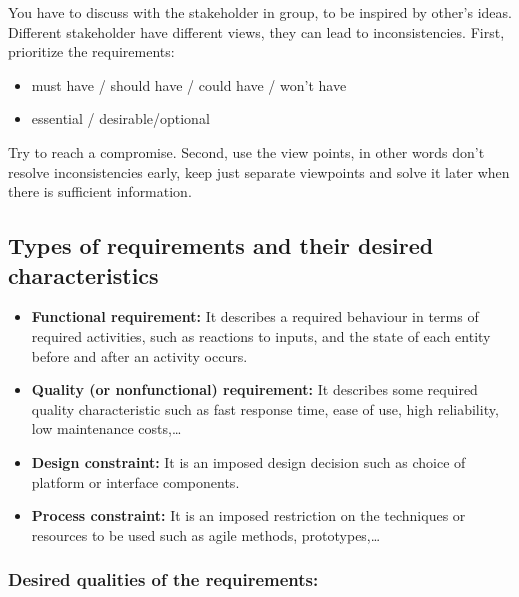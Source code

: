 You have to discuss with the stakeholder in group, to be inspired by other’s ideas. Different
stakeholder have different views, they can lead to inconsistencies. First, prioritize the
requirements:
\begin{itemize}
	\item must have / should have / could have / won't have
	\item essential / desirable/optional
\end{itemize}

Try to reach a compromise. Second, use the view points, in other words
don’t resolve inconsistencies early, keep just separate viewpoints and solve it later when
there is sufficient information.

\subsection{Types of requirements and their desired characteristics}

\begin{itemize}
    \item \textbf{Functional requirement:}
        It describes a required behaviour in terms of required activities, such as reactions to inputs,
        and the state of each entity before and after an activity occurs.

    \item \textbf{Quality (or nonfunctional) requirement:}
        It describes some required quality characteristic such as fast response time, ease of use,
        high reliability, low maintenance costs,\ldots

    \item \textbf{Design constraint:}
        It is an imposed design decision such as choice of platform or interface components.

    \item \textbf{Process constraint:}
        It is an imposed restriction on the techniques or resources to be used such as agile methods,
        prototypes,\ldots
\end{itemize}

\subsubsection{Desired qualities of the requirements:}

